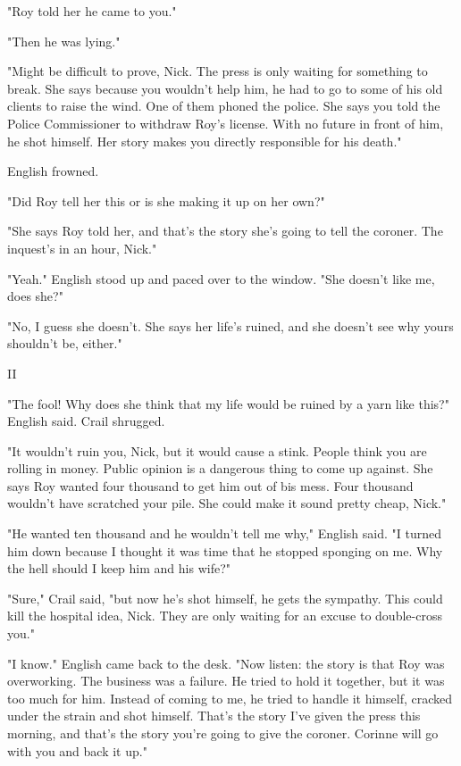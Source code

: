 \documentclass{novel}
\begin{document}
"Roy told her he came to you."

"Then he was lying."

"Might be difficult to prove, Nick. The press is only waiting for something to break. She says because you wouldn't help him, he had to go to some of his old clients to raise the wind. One of them phoned the police. She says you told the Police Commissioner to withdraw Roy's license. With no future in front of him, he shot himself. Her story makes you directly responsible for his death."

English frowned.

"Did Roy tell her this or is she making it up on her own?"

"She says Roy told her, and that's the story she's going to tell the coroner. The inquest's in an hour, Nick."

"Yeah." English stood up and paced over to the window. "She doesn't like me, does she?"

"No, I guess she doesn't. She says her life's ruined, and she doesn't see why yours shouldn't be, either."



II

"The fool! Why does she think that my life would be ruined by a yarn like this?" English said. Crail shrugged.

"It wouldn't ruin you, Nick, but it would cause a stink. People think you are rolling in money. Public opinion is a dangerous thing to come up against. She says Roy wanted four thousand to get him out of bis mess. Four thousand wouldn't have scratched your pile. She could make it sound pretty cheap, Nick."

"He wanted ten thousand and he wouldn't tell me why," English said. "I turned him down because I thought it was time that he stopped sponging on me. Why the hell should I keep him and his wife?"

"Sure," Crail said, "but now he's shot himself, he gets the sympathy. This could kill the hospital idea, Nick. They are only waiting for an excuse to double-cross you."

"I know." English came back to the desk. "Now listen: the story is that Roy was overworking. The business was a failure. He tried to hold it together, but it was too much for him. Instead of coming to me, he tried to handle it himself, cracked under the strain and shot himself. That's the story I've given the press this morning, and that's the story you're going to give the coroner. Corinne will go with you and back it up."
\end{document}
